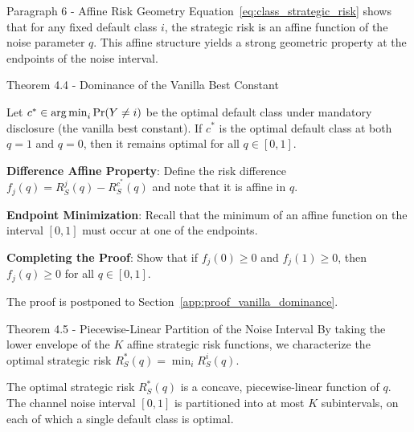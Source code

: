 \begin{sourceblock}{Paragraph 6 - Affine Risk Geometry}
Equation~\eqref{eq:class_strategic_risk} shows that for any fixed default class $i$, the strategic risk is an affine function of the noise parameter $q$. This affine structure yields a strong geometric property at the endpoints of the noise interval.
\end{sourceblock}

\begin{faqblock}
\faqanswers
{}
\end{faqblock}

\begin{sourceblock}{Theorem 4.4 - Dominance of the Vanilla Best Constant}
\begin{theorem}
\label{thm:vanilla_dominance}
Let $c^* \in \operatorname*{arg\,min}_i \Pr(Y \ne i)$ be the optimal default class under mandatory disclosure (the vanilla best constant). If $c^*$ is the optimal default class at both $q = 1$ and $q = 0$, then it remains optimal for all $q \in [0, 1]$.
\end{theorem}
\end{sourceblock}

\begin{guideblock}
\item \textbf{Difference Affine Property}: Define the risk difference $f_j(q) = R^j_S(q) - R^{c^*}_S(q)$ and note that it is affine in $q$.
\item \textbf{Endpoint Minimization}: Recall that the minimum of an affine function on the interval $[0,1]$ must occur at one of the endpoints.
\item \textbf{Completing the Proof}: Show that if $f_j(0) \ge 0$ and $f_j(1) \ge 0$, then $f_j(q) \ge 0$ for all $q \in [0,1]$.
\end{guideblock}
The proof is postponed to Section~\ref{app:proof_vanilla_dominance}.

\begin{sourceblock}{Theorem 4.5 - Piecewise-Linear Partition of the Noise Interval}
By taking the lower envelope of the $K$ affine strategic risk functions, we characterize the optimal strategic risk $R^*_S(q) = \min_i R^i_S(q)$.
\begin{theorem}
\label{thm:piecewise_linear_noise}
The optimal strategic risk $R^*_S(q)$ is a concave, piecewise-linear function of $q$. The channel noise interval $[0, 1]$ is partitioned into at most $K$ subintervals, on each of which a single default class is optimal.
\end{theorem}
\end{sourceblock}

